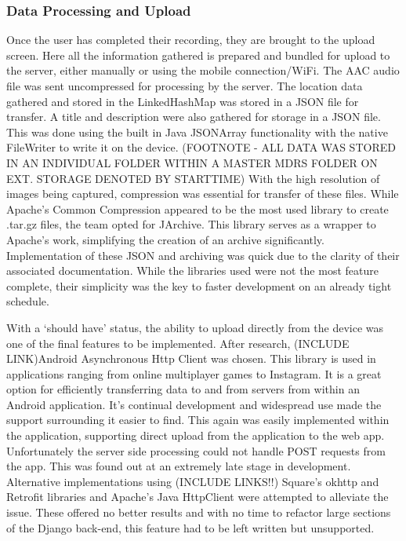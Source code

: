 \documentclass{l3proj}
\begin{document}
\subsubsection {Data Processing and Upload}
Once the user has completed their recording, they are brought to the upload screen. Here all the information gathered is prepared and bundled for upload to the server, either manually or using the mobile connection/WiFi. The AAC audio file was sent uncompressed for processing by the server. The location data gathered and stored in the LinkedHashMap was stored in a JSON file for transfer. A title and description were also gathered for storage in a JSON file. This was done using the built in Java JSONArray functionality with the native FileWriter to write it on the device.
(FOOTNOTE - ALL DATA WAS STORED IN AN INDIVIDUAL FOLDER WITHIN A MASTER MDRS FOLDER ON EXT. STORAGE DENOTED BY STARTTIME)
With the high resolution of images being captured, compression was essential for transfer of these files. While Apache’s Common Compression appeared to be the most used library to create .tar.gz files, the team opted for JArchive. This library serves as a wrapper to Apache’s work, simplifying the creation of an archive significantly. Implementation of these JSON and archiving was quick due to the clarity of their associated documentation. While the libraries used were not the most feature complete, their simplicity was the key to faster development on an already tight schedule.

With a ‘should have’ status, the ability to upload directly from the device was one of the final features to be implemented. After research, (INCLUDE LINK)Android Asynchronous Http Client was chosen. This library is used in applications ranging from online multiplayer games to Instagram. It is a great option for efficiently transferring data to and from servers from within an Android application. It’s continual development and widespread use made the support surrounding it easier to find. This again was easily implemented within the application, supporting direct upload from the application to the web app. Unfortunately the server side processing could not handle POST requests from the app. This was found out at an extremely late stage in development. Alternative implementations using (INCLUDE LINKS!!) Square’s okhttp and Retrofit libraries and Apache’s Java HttpClient were attempted to alleviate the issue. These offered no better results and with no time to refactor large sections of the Django back-end, this feature had to be left written but unsupported.
\end{document}
